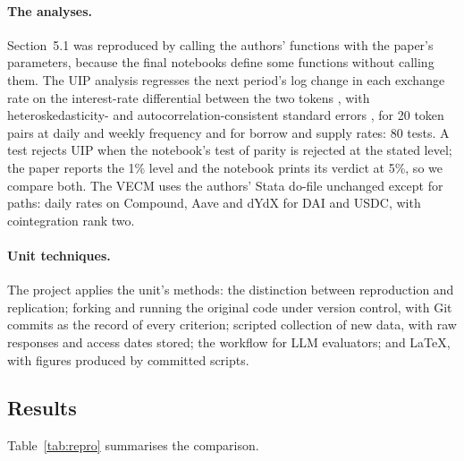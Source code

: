 \documentclass[11pt]{article}
\begin{document}
\paragraph{The analyses.} Section~5.1 was reproduced by calling the authors' functions with the paper's parameters, because the final notebooks define some functions without calling them. The UIP analysis regresses the next period's log change in each exchange rate on the interest-rate differential between the two tokens \citep{fama1984forward}, with heteroskedasticity- and autocorrelation-consistent standard errors \citep{newey1987simple}, for 20 token pairs at daily and weekly frequency and for borrow and supply rates: 80 tests. A test rejects UIP when the notebook's test of parity is rejected at the stated level; the paper reports the 1\% level and the notebook prints its verdict at 5\%, so we compare both. The VECM uses the authors' Stata do-file unchanged except for paths: daily rates on Compound, Aave and dYdX for DAI and USDC, with cointegration rank two.

\paragraph{Unit techniques.} The project applies the unit's methods: the distinction between reproduction and replication; forking and running the original code under version control, with Git commits as the record of every criterion; scripted collection of new data, with raw responses and access dates stored; the workflow for LLM evaluators; and \LaTeX, with figures produced by committed scripts.

\subsection{Results}

Table~\ref{tab:repro} summarises the comparison.
\end{document}
